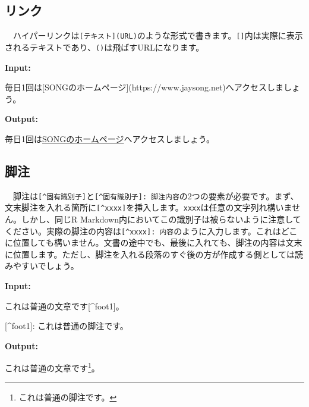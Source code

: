 \documentclass[
  a4paper,
  pandoc,
  ja=standard,
  jafont=haranoaji]{bxjsbook}
\newenvironment{Shaded}{\begin{snugshade}}{\end{snugshade}}
\newcommand{\CommentTok}[1]{\textcolor[rgb]{0.37,0.37,0.37}{#1}}
\newcommand{\NormalTok}[1]{\textcolor[rgb]{0.00,0.48,0.65}{#1}}
\newcommand{\OtherTok}[1]{\textcolor[rgb]{0.00,0.48,0.65}{#1}}
\begin{document}
\hypertarget{ux30eaux30f3ux30af}{%
\subsection{リンク}\label{ux30eaux30f3ux30af}}

　ハイパーリンクは\texttt{{[}テキスト{]}(URL)}のような形式で書きます。\texttt{{[}{]}}内は実際に表示されるテキストであり、\texttt{()}は飛ばすURLになります。

\textbf{Input:}

\begin{Shaded}
\begin{Highlighting}[]
\NormalTok{毎日1回は}\CommentTok{[}\OtherTok{SONGのホームページ}\CommentTok{](https://www.jaysong.net)}\NormalTok{へアクセスしましょう。}
\end{Highlighting}
\end{Shaded}

\textbf{Output:}

毎日1回は\href{https://www.jaysong.net}{SONGのホームページ}へアクセスしましょう。

\hypertarget{ux811aux6ce8}{%
\subsection{脚注}\label{ux811aux6ce8}}

　脚注は\texttt{{[}\^{}固有識別子{]}}と\texttt{{[}\^{}固有識別子{]}:\ 脚注内容}の2つの要素が必要です。まず、文末脚注を入れる箇所に\texttt{{[}\^{}xxxx{]}}を挿入します。\texttt{xxxx}は任意の文字列れ構いません。しかし、同じR
Markdown内においてこの識別子は被らないように注意してください。実際の脚注の内容は\texttt{{[}\^{}xxxx{]}:\ 内容}のように入力します。これはどこに位置しても構いません。文書の途中でも、最後に入れても、脚注の内容は文末に位置します。ただし、脚注を入れる段落のすぐ後の方が作成する側としては読みやすいでしょう。

\textbf{Input:}

\begin{Shaded}
\begin{Highlighting}[]
\NormalTok{これは普通の文章です}\OtherTok{[\^{}foot1]}\NormalTok{。}

\OtherTok{[\^{}foot1]: }\NormalTok{これは普通の脚注です。}
\end{Highlighting}
\end{Shaded}

\textbf{Output:}

これは普通の文章です\footnote{これは普通の脚注です。}。
\end{document}
